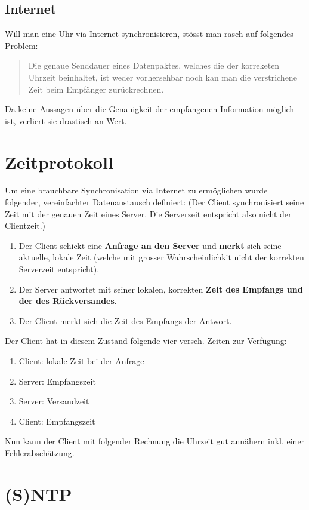 \subsection{Internet}
Will man eine Uhr via Internet synchronisieren, stösst man rasch auf folgendes Problem:

\begin{verse}
Die genaue Senddauer eines  Datenpaktes, welches die der korreketen Uhrzeit beinhaltet, ist weder vorhersehbar noch kan man die verstrichene Zeit beim Empfänger zurückrechnen.
\end{verse}

Da keine Aussagen über die Genauigkeit der empfangenen Information möglich ist, verliert sie drastisch an Wert.

\section{Zeitprotokoll}
Um eine brauchbare Synchronisation via Internet zu ermöglichen wurde folgender, vereinfachter Datenaustausch definiert: (Der Client synchronisiert seine Zeit mit der genauen Zeit eines Server. Die Serverzeit entspricht also nicht der Clientzeit.)

\begin{enumerate}
\item Der Client schickt eine \textbf{Anfrage an den Server} und \textbf{merkt} sich seine aktuelle, lokale Zeit (welche mit grosser Wahrscheinlichkit nicht der korrekten Serverzeit entspricht).
\item Der Server antwortet mit seiner lokalen, korrekten \textbf{Zeit des Empfangs und der des Rückversandes}.
\item Der Client merkt sich die Zeit des Empfangs der Antwort. 
\end{enumerate}

Der Client hat in diesem Zustand folgende vier versch. Zeiten zur Verfügung:
\begin{enumerate}
\item Client: lokale Zeit bei der Anfrage
\item Server: Empfangszeit
\item Server: Versandzeit
\item Client: Empfangszeit
\end{enumerate}

Nun kann der Client mit folgender Rechnung die Uhrzeit gut annähern inkl. einer Fehlerabschätzung.



\section{(S)NTP}




